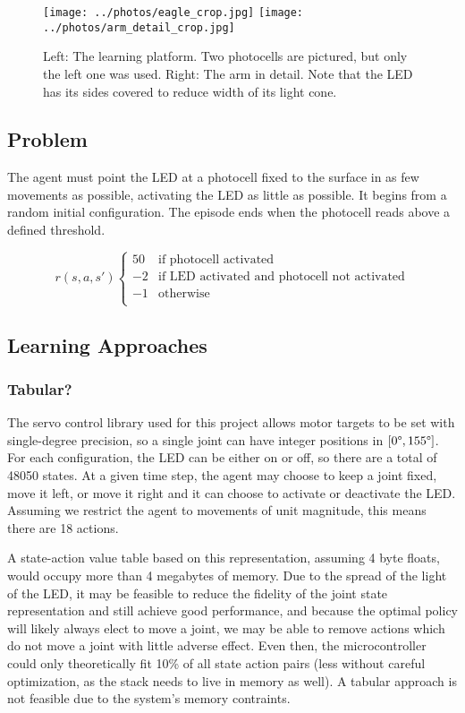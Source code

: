\documentclass{article}
\begin{document}
	
	\begin{figure}
		\centering
		\texttt{[image: ../photos/eagle\_crop.jpg]}
		\texttt{[image: ../photos/arm\_detail\_crop.jpg]}
		\caption{Left: The learning platform. Two photocells are pictured, but only the left one was used. Right: The arm in detail. Note that the LED has its sides covered to reduce width of its light cone. }
		\label{fig:platform}
	\end{figure}
	
	
	\subsection{Problem}
	
	The agent must point the LED at a photocell fixed to the surface in as few movements as possible, activating the LED as little as possible. It begins from a random initial configuration. The episode ends when the photocell reads above a defined threshold. 
	
	\[ r(s,a,s')  \left\{
	\begin{array}{ll}
		50 & \text{if photocell activated} \\
		-2 & \text{if LED activated and photocell not activated} \\
		-1 & \text{otherwise} \\
	\end{array} 
	\right. \]
	
	
	\subsection{Learning Approaches}
	
	\subsubsection{Tabular?}
	
	The servo control library used for this project allows motor targets to be set with single-degree precision, so a single joint can have integer positions in  $[0\degree, 155\degree]$. For each configuration, the LED can be either on or off, so there are a total of 48050 states. At a given time step, the agent may choose to keep a joint fixed, move it left, or move it right and it can choose to activate or deactivate the LED. Assuming we restrict the agent to movements of unit magnitude, this means there are 18 actions.

	A state-action value table based on this representation, assuming 4 byte floats, would occupy more than 4 megabytes of memory. Due to the spread of the light of the LED, it may be feasible to reduce the fidelity of the joint state representation and still achieve good performance, and because the optimal policy will likely always elect to move a joint, we may be able to remove actions which do not move a joint with little adverse effect. Even then, the microcontroller could only theoretically fit 10\% of all state action pairs (less without careful optimization, as the stack needs to live in memory as well). A tabular approach is not feasible due to the system's memory contraints.
	
\end{document}
